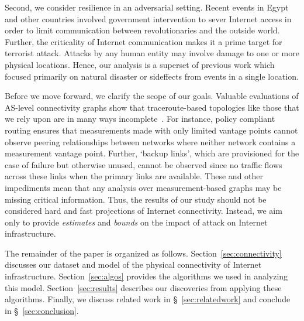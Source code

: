             Second, we consider resilience in an adversarial setting.
            Recent events in Egypt~\cite{thenews} and other countries involved government intervention to sever Internet access in order to limit communication between revolutionaries and the outside world.
            Further, the criticality of Internet communication makes it a prime target for terrorist attack.
            Attacks by any human entity may involve damage to one or more physical locations.
            Hence, our analysis is a superset of previous work which focused primarily on natural disaster or sideffects from events in a single location.

    Before we move forward, we clarify the scope of our goals.
    Valuable evaluations of AS-level connectivity graphs show that traceroute-based topologies like those that we rely upon are in many ways incomplete~\cite{walter}.
    For instance, policy compliant routing ensures that measurements made with only limited vantage points cannot observe peering relationships between networks where neither network contains a measurement vantage point.
    Further, `backup links', which are provisioned for the case of failure but otherwise unused, cannot be observed since no traffic flows across these links when the primary links are available. 
    These and other impediments mean that any analysis over measurement-based graphs may be missing critical information.
    Thus, the results of our study should not be considered hard and fast projections of Internet connectivity.
    Instead, we aim only to provide {\it estimates} and {\it bounds} on the impact of attack on Internet infrastructure.

    The remainder of the paper is organized as follows. 
    Section~\ref{sec:connectivity} discusses our dataset and model of the physical connectivity of Internet infrastructure.
    Section~\ref{sec:algos} provides the algorithms we used in analyzing this model.
    Section~\ref{sec:results} describes our discoveries from applying these algorithms.
    Finally, we discuss related work in \S~\ref{sec:relatedwork} and conclude in \S~\ref{sec:conclusion}.

